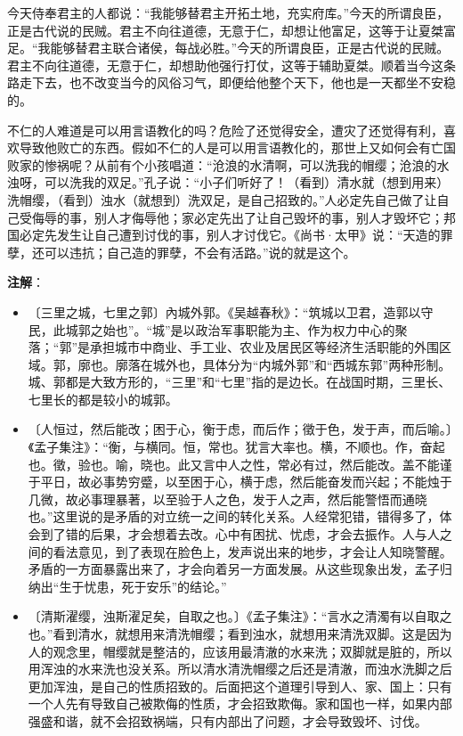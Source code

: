 \documentclass[12pt,UTF-8,openany]{ctexbook}
\begin{document}
\begin{normalsize}
    今天侍奉君主的人都说：“我能够替君主开拓土地，充实府库。”今天的所谓良臣，正是古代说的民贼。君主不向往道德，无意于仁，却想让他富足，这等于让夏桀富足。“我能够替君主联合诸侯，每战必胜。”今天的所谓良臣，正是古代说的民贼。君主不向往道德，无意于仁，却想助他强行打仗，这等于辅助夏桀。顺着当今这条路走下去，也不改变当今的风俗习气，即便给他整个天下，他也是一天都坐不安稳的。
    
    不仁的人难道是可以用言语教化的吗？危险了还觉得安全，遭灾了还觉得有利，喜欢导致他败亡的东西。假如不仁的人是可以用言语教化的，那世上又如何会有亡国败家的惨祸呢？从前有个小孩唱道：“沧浪的水清啊，可以洗我的帽缨；沧浪的水浊呀，可以洗我的双足。”孔子说：“小子们听好了！（看到）清水就（想到用来）洗帽缨，（看到）浊水（就想到）洗双足，是自己招致的。”人必定先自己做了让自己受侮辱的事，别人才侮辱他；家必定先出了让自己毁坏的事，别人才毁坏它；邦国必定先发生让自己遭到讨伐的事，别人才讨伐它。《尚书·太甲》说：“天造的罪孽，还可以违抗；自己造的罪孽，不会有活路。”说的就是这个。
    
\end{normalsize}


\newpage

\textbf{注解}：

\vspace{-1em}

\begin{itemize}
    \setlength\itemsep{-0.2em}
    \item〔三里之城，七里之郭〕內城外郭。《吴越春秋》：“筑城以卫君，造郭以守民，此城郭之始也”。“城”是以政治军事职能为主、作为权力中心的聚落；“郭”是承担城市中商业、手工业、农业及居民区等经济生活职能的外围区域。郭，廓也。廓落在城外也，具体分为“内城外郭”和“西城东郭”两种形制。城、郭都是大致方形的，“三里”和“七里”指的是边长。在战国时期，三里长、七里长的都是较小的城郭。
    \item〔人恒过，然后能改；困于心，衡于虑，而后作；徵于色，发于声，而后喻。〕《孟子集注》：“衡，与横同。恒，常也。犹言大率也。横，不顺也。作，奋起也。徵，验也。喻，晓也。此又言中人之性，常必有过，然后能改。盖不能谨于平日，故必事势穷蹙，以至困于心，横于虑，然后能奋发而兴起；不能烛于几微，故必事理暴著，以至验于人之色，发于人之声，然后能警悟而通晓也。”这里说的是矛盾的对立统一之间的转化关系。人经常犯错，错得多了，体会到了错的后果，才会想着去改。心中有困扰、忧虑，才会去振作。人与人之间的看法意见，到了表现在脸色上，发声说出来的地步，才会让人知晓警醒。矛盾的一方面暴露出来了，才会向着另一方面发展。从这些现象出发，孟子归纳出“生于忧患，死于安乐”的结论。”
    \item〔清斯濯缨，浊斯濯足矣，自取之也。〕《孟子集注》：“言水之清濁有以自取之也。”看到清水，就想用来清洗帽缨；看到浊水，就想用来清洗双脚。这是因为人的观念里，帽缨就是整洁的，应该用最清澈的水来洗；双脚就是脏的，所以用浑浊的水来洗也没关系。所以清水清洗帽缨之后还是清澈，而浊水洗脚之后更加浑浊，是自己的性质招致的。后面把这个道理引导到人、家、国上：只有一个人先有导致自己被欺侮的性质，才会招致欺侮。家和国也一样，如果内部强盛和谐，就不会招致祸端，只有内部出了问题，才会导致毁坏、讨伐。
\end{itemize}
\end{document}
